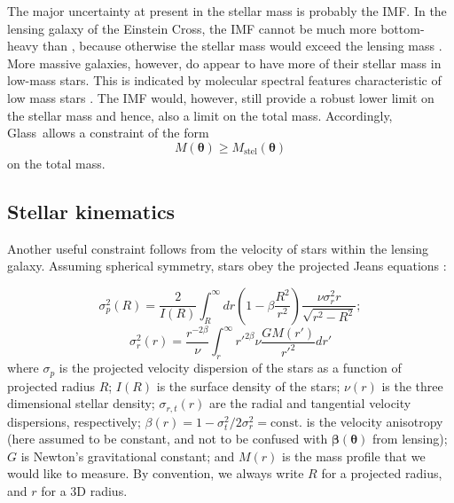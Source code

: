 \documentclass[galley,usenatbib]{mn2e}
\renewcommand{\vec}[1]{\ensuremath{\boldsymbol{#1}}}
\newcommand{\Glass}{{\sc Glass}}
\newcommand{\Mddd}{\ensuremath{M}}
\begin{document}
The major uncertainty at present in the stellar mass is probably the IMF.  In
the lensing galaxy of the Einstein Cross, the IMF cannot be much more
bottom-heavy than \cite{2003PASP..115..763C}, because otherwise the stellar
mass would exceed the lensing mass \cite{2010MNRAS.409L..30F}.  More massive
galaxies, however, do appear to have more of their stellar mass in low-mass
stars.  This is indicated by molecular spectral features characteristic of low
mass stars
\citep{2004ApJ...614L.101C,2012ApJ...747...69C,2013MNRAS.429L..15F}.
The \cite{2003PASP..115..763C} IMF would, however, still provide a robust
lower limit on the stellar mass and hence, also a limit on the total
mass.  Accordingly, \Glass\ allows a constraint of the form
%
\begin{equation} 
M(\vec\theta) \geq M_\mathrm{stel}(\vec\theta)
\end{equation} 
%
on the total mass.

\subsection{Stellar kinematics}\label{sec:kinematics} 

Another useful constraint follows from the velocity of stars within the lensing
galaxy. Assuming spherical symmetry, stars obey the projected Jeans equations
\citep[e.g.][]{2008gady.book.....B}: 

\begin{equation}
\sigma_p^2(R) = \frac{2}{I(R)}\int_R^\infty dr \left(1-\beta \frac{R^2}{r^2}\right) \frac{\nu \sigma_r^2 r}{\sqrt{r^2 - R^2}};
\label{eqn:sphericaljeans}
\end{equation}
%
\begin{equation} 
\sigma_r^2(r) = \frac{r^{-2\beta}}{\nu}\int_r^\infty r'^{2\beta} \nu \frac{G\Mddd(r')}{r'^2}dr'
\end{equation} 
%
where $\sigma_p$ is the projected velocity dispersion of the stars as a
function of projected radius $R$; $I(R)$ is the surface density of the stars;
$\nu(r)$ is the three dimensional stellar density; $\sigma_{r,t}(r)$ are the
radial and tangential velocity dispersions, respectively; $\beta(r) = 1 -
\sigma_t^2/2\sigma_r^2 = \mathrm{const.}$ is the velocity anisotropy (here
assumed to be constant, and not to be confused with $\vec\beta(\vec\theta)$
from lensing); $G$ is Newton's gravitational constant; and $\Mddd(r)$ is the
mass profile that we would like to measure. By convention, we always write $R$
for a projected radius, and $r$ for a 3D radius.
\end{document}
